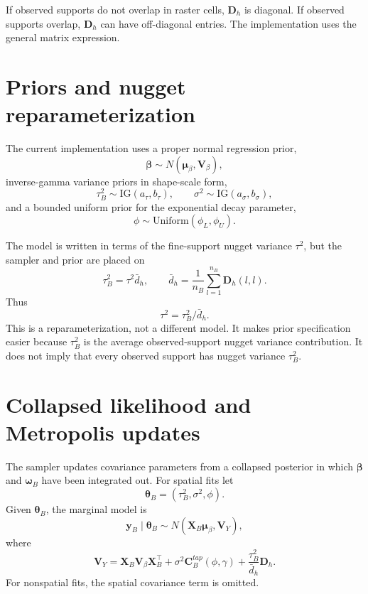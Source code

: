 \documentclass[11pt]{article}
\newcommand{\by}{\bm{y}}
\newcommand{\bbeta}{\bm{\beta}}
\newcommand{\bw}{\bm{\omega}}
\newcommand{\btheta}{\bm{\theta}}
\newcommand{\bC}{\bm{C}}
\newcommand{\bD}{\bm{D}}
\newcommand{\bV}{\bm{V}}
\newcommand{\bX}{\bm{X}}
\newcommand{\trans}{^\top}
\begin{document}
If observed supports do not overlap in raster cells, \(\bD_h\) is diagonal. If
observed supports overlap, \(\bD_h\) can have off-diagonal entries. The
implementation uses the general matrix expression.

\section{Priors and nugget reparameterization}

The current implementation uses a proper normal regression prior,
\begin{equation}
  \bbeta\sim N(\bm{\mu}_\beta,\bV_\beta),
\end{equation}
inverse-gamma variance priors in shape-scale form,
\begin{equation}
  \tau_B^2 \sim \mathrm{IG}(a_\tau,b_\tau),
  \qquad
  \sigma^2 \sim \mathrm{IG}(a_\sigma,b_\sigma),
\end{equation}
and a bounded uniform prior for the exponential decay parameter,
\begin{equation}
  \phi\sim\mathrm{Uniform}(\phi_L,\phi_U).
\end{equation}

The model is written in terms of the fine-support nugget variance \(\tau^2\),
but the sampler and prior are placed on
\begin{equation}
  \tau_B^2 = \tau^2\bar d_h,
  \qquad
  \bar d_h = \frac{1}{n_B}\sum_{l=1}^{n_B}\bD_h(l,l).
\end{equation}
Thus
\begin{equation}
  \tau^2 = \tau_B^2/\bar d_h.
\end{equation}
This is a reparameterization, not a different model. It makes prior
specification easier because \(\tau_B^2\) is the average observed-support
nugget variance contribution. It does not imply that every observed support
has nugget variance \(\tau_B^2\).

\section{Collapsed likelihood and Metropolis updates}

The sampler updates covariance parameters from a collapsed posterior in which
\(\bbeta\) and \(\bw_B\) have been integrated out. For spatial fits let
\[
  \btheta_B=(\tau_B^2,\sigma^2,\phi).
\]
Given \(\btheta_B\), the marginal model is
\begin{equation}
  \by_B\mid\btheta_B
  \sim
  N(\bX_B\bm{\mu}_\beta,\bV_Y),
\end{equation}
where
\begin{equation}
  \bV_Y =
  \bX_B\bV_\beta\bX_B\trans +
  \sigma^2\bC_B^{tap}(\phi,\gamma) +
  \frac{\tau_B^2}{\bar d_h}\bD_h .
\end{equation}
For nonspatial fits, the spatial covariance term is omitted.
\end{document}
